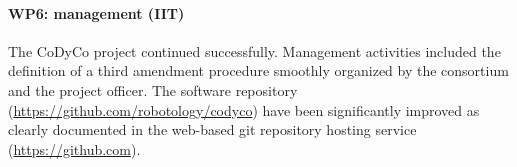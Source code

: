 

\paragraph*{WP6: management (IIT)}

The CoDyCo project continued successfully. Management activities included the definition of a third amendment procedure smoothly organized by the consortium and the project officer. The software repository (\url{https://github.com/robotology/codyco}) have been significantly improved as clearly documented in the web-based git repository hosting service (\url{https://github.com}). 